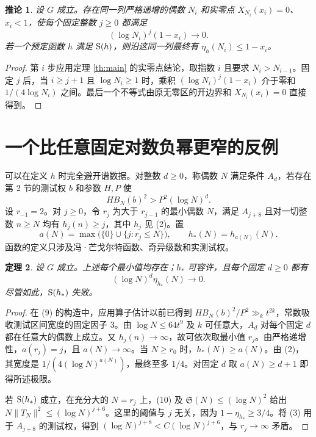 \documentclass[UTF8,a4paper,11pt,fontset=windows]{ctexart}
\newtheorem{theorem}{定理}
\newtheorem{corollary}[theorem]{推论}
\newcommand{\Sg}{\mathfrak S}
\begin{document}
\begin{corollary}\label{co:seq}
设 \(G\) 成立。存在同一列严格递增的偶数 \(N_i\) 和实零点 \(X_{N_i}(x_i)=0\)、\(x_i<1\)，使每个固定整数 \(j\ge0\) 都满足
\[
             (\log N_i)^j(1-x_i)\longrightarrow 0.
\]
若一个预定函数 \(h\) 满足 \({\rm S}(h)\)，则沿这同一列最终有
\(\eta_h(N_i)\le 1-x_i\)。
\end{corollary}
\begin{proof}
第 \(i\) 步应用定理 \ref{th:main} 的实零点结论，取指数 \(i\) 且要求 \(N_i>N_{i-1}\)。固定 \(j\) 后，当 \(i\ge j+1\) 且 \(\log N_i\ge1\) 时，乘积 \((\log N_i)^j(1-x_i)\) 介于零和 \(1/(4\log N_i)\) 之间。最后一个不等式由原无零区的开边界和 \(X_{N_i}(x_i)=0\) 直接得到。
\end{proof}

\section{一个比任意固定对数负幂更窄的反例}

可以在定义 \(h\) 时完全避开谱数据。对整数 \(d\ge0\)，称偶数 \(N\) 满足条件 \(A_d\)，若存在第 2 节的测试权 \(b\) 和参数 \(H,P\) 使
\[
                H B_N(b)^2>P^2(\log N)^d .
\]
设 \(r_{-1}=2\)。对 \(j\ge0\)，令 \(r_j\) 为大于 \(r_{j-1}\) 的最小偶数 \(N\)，满足 \(A_{j+8}\) 且对一切整数 \(n\ge N\) 均有 \(h_j(n)\ge j\)，其中 \(h_j\) 见 (2)。置
\[
 a(N)=\max\big(\{0\}\cup\{j:r_j\le N\}\big),\qquad
                    h_*(N)=h_{a(N)}(N).
\]
函数的定义只涉及冯·芒戈尔特函数、奇异级数和实测试权。

\begin{theorem}\label{th:arithwidth}
设 \(G\) 成立。上述每个最小值均存在；\(h_*\) 可容许，且每个固定 \(d\ge0\) 都有
\[
             (\log N)^d\eta_{h_*}(N)\longrightarrow0 .
\]
尽管如此，\({\rm S}(h_*)\) 失败。
\end{theorem}
\begin{proof}
在 (9) 的构造中，应用算子估计以前已得到 \(HB_N(b)^2/P^2\gg_k t^{2k}\)，常数吸收测试区间宽度的固定因子 \(3\)。由 \(\log N\le64t^9\) 及 \(k\) 可任意大，\(A_d\) 对每个固定 \(d\) 都在任意大的偶数上成立。又 \(h_j(n)\to\infty\)，故可依次取最小值 \(r_j\)。由严格递增性，\(a(r_j)=j\)，且 \(a(N)\to\infty\)。当 \(N\ge r_0\) 时，\(h_*(N)\ge a(N)\)。由 (2)，其宽度是 \(1/(4(\log N)^{a(N)})\)，最终至多 \(1/4\)。对固定 \(d\) 取 \(a(N)\ge d+1\) 即得所述极限。

若 \({\rm S}(h_*)\) 成立，在充分大的 \(N=r_j\) 上，(10) 及 \(\Sg(N)\le(\log N)^2\) 给出 \(N\|T_N\|^2\le(\log N)^{j+6}\)。这里的阈值与 \(j\) 无关，因为 \(1-\eta_{h_*}\ge3/4\)。将 (3) 用于 \(A_{j+8}\) 的测试权，得到 \((\log N)^{j+8}< C(\log N)^{j+6}\)，与 \(r_j\to\infty\) 矛盾。
\end{proof}
\end{document}
